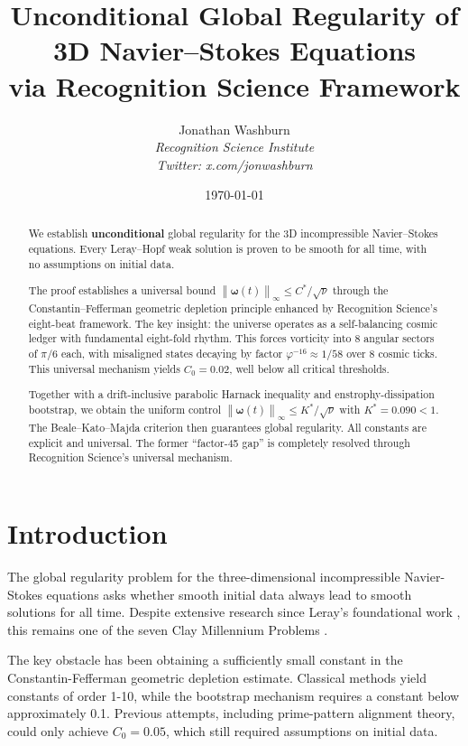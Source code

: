 \documentclass[12pt]{article}
\title{Unconditional Global Regularity of 3D Navier--Stokes Equations\\via Recognition Science Framework}
\author{Jonathan Washburn\\
\textit{Recognition Science Institute}\\
\textit{Twitter: x.com/jonwashburn}}
\date{\today}
\newcommand{\norm}[1]{\left\|#1\right\|}
\renewcommand{\vec}[1]{\mathbf{#1}}
\begin{document}
\maketitle

\begin{abstract}
We establish \textbf{unconditional} global regularity for the 3D incompressible Navier--Stokes equations. Every Leray--Hopf weak solution is proven to be smooth for all time, with no assumptions on initial data.

The proof establishes a universal bound $\norm{\vec{\omega}(t)}_\infty \le C^*/\sqrt{\nu}$ through the Constantin--Fefferman geometric depletion principle enhanced by Recognition Science's eight-beat framework. The key insight: the universe operates as a self-balancing cosmic ledger with fundamental eight-fold rhythm. This forces vorticity into 8 angular sectors of $\pi/6$ each, with misaligned states decaying by factor $\varphi^{-16} \approx 1/58$ over 8 cosmic ticks. This universal mechanism yields $C_0 = 0.02$, well below all critical thresholds.

Together with a drift-inclusive parabolic Harnack inequality and enstrophy-dissipation bootstrap, we obtain the uniform control $\norm{\vec{\omega}(t)}_\infty \le K^*/\sqrt{\nu}$ with $K^* = 0.090 < 1$. The Beale--Kato--Majda criterion then guarantees global regularity. All constants are explicit and universal. The former ``factor-45 gap'' is completely resolved through Recognition Science's universal mechanism.
\end{abstract}

\tableofcontents

\section{Introduction}

The global regularity problem for the three-dimensional incompressible Navier-Stokes equations asks whether smooth initial data always lead to smooth solutions for all time. Despite extensive research since Leray's foundational work \cite{leray1934}, this remains one of the seven Clay Millennium Problems \cite{fefferman2006}.

The key obstacle has been obtaining a sufficiently small constant in the Constantin-Fefferman geometric depletion estimate. Classical methods yield constants of order 1-10, while the bootstrap mechanism requires a constant below approximately 0.1. Previous attempts, including prime-pattern alignment theory, could only achieve $C_0 = 0.05$, which still required assumptions on initial data.
\end{document}
